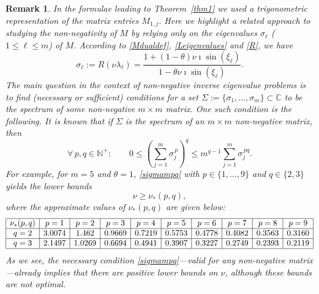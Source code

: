 \documentclass[smallextended,numbook,runningheads]{svjour3}     %
\newtheorem{remark}{Remark}
\newtheorem{remark}{Remark}
\newcommand{\te}{\theta}
\newcommand{\nplus}{\mathbb{N}^+}
\begin{document}
\begin{remark} 
In the formulae leading to Theorem~\ref{thm1} we used a trigonometric representation of the matrix
\emph{entries} $M_{1,j}$. Here we highlight a related approach to studying the non-negativity of $M$ by
relying only on the \emph{eigenvalues} $\sigma_\ell$ ($1\le \ell\le m$) of $M$. According to
\eqref{Mdualdef}, \eqref{Leigenvalues} and \eqref{R}, we have
\[
\sigma_\ell:=R(\nu\lambda_\ell)=\frac{1+ (1-\theta )\nu \imath \sin \left(\xi _\ell\right)}{1- \theta\nu \imath  \sin \left(\xi _\ell\right)}.
\]
The main question in the context of \emph{non-negative inverse eigenvalue problems} is to 
find (necessary or sufficient) conditions for a set $\Sigma:=\{\sigma_1,\ldots,\sigma_m\}\subset\mathbb{C}$ to be the spectrum of \emph{some} non-negative $m \times m$ matrix.
One such condition is the following. It is known \cite[Chapter 4]{nonnegmatr} that if $\Sigma$ is the spectrum of 
an $m \times m$ non-negative matrix, then 
\begin{equation}\label{sigmampq}
\forall\, p, q \in\nplus:\quad\quad 0\le \left(\sum_{j=1}^m \sigma_j^{\,p}\right)^q\le m^{q-1} \sum_{j=1}^m \sigma_j^{\,p q}.
\end{equation}
For example, for $m=5$ and $\te=1$, \eqref{sigmampq} with  $p\in\{1,\ldots,9\}$ and $q\in\{2,3\}$ yields the lower bounds
\begin{equation}\label{nustartpq}
\nu\ge \nu_{*}(p,q),
\end{equation}
where the approximate values of $\nu_{*}(p,q)$ are given below:
\[
\begin{array}{|c|c|c|c|c|c|c|c|c|c|}
\hline
\nu_{*}(p,q) & p=1 & p=2 & p=3 & p=4 & p=5 & p=6 & p=7 & p=8 & p=9 \\
\hline
q=2 & 3.0074 & 1.462 & 0.9669 & 0.7219 & 0.5753 & 0.4778 & 0.4082 & 0.3563 & 0.3160 \\
\hline
q=3 & 2.1497 & 1.0269 & 0.6694  & 0.4941 & 0.3907 & 0.3227  & 0.2749  & 0.2393  &  0.2119 \\
\hline
\end{array}
\]
As we see, the necessary condition \eqref{sigmampq}---valid for \emph{any} non-negative matrix---already 
implies that there are positive \emph{lower} bounds on $\nu$, although these bounds are not optimal. 

\end{remark}
\end{document}
